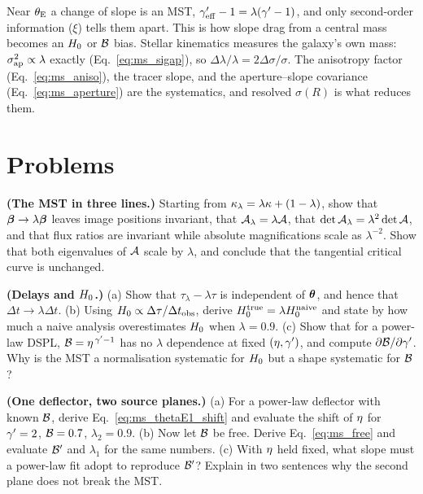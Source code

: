 Near $\theta_{\mathrm{E}}$ a change of slope is an MST, $\gamma'_{\rm eff}-1=\lambda(\gamma'-1)$,
and only second-order information ($\xi$) tells them apart.  This is how
slope drag from a central mass becomes an $H_0$ or $\mathcal{B}$ bias.
Stellar kinematics measures the galaxy's own mass:
$\sigma_{\rm ap}^2\propto\lambda$ exactly (Eq.~\ref{eq:ms_sigap}), so
$\Delta\lambda/\lambda=2\Delta\sigma/\sigma$.  The anisotropy factor
(Eq.~\ref{eq:ms_aniso}), the tracer slope, and the aperture--slope covariance
(Eq.~\ref{eq:ms_aperture}) are the systematics, and resolved $\sigma(R)$ is
what reduces them.


\section{Problems}
\label{sec:ms_problems}

\begin{exercise}
\label{ex:ms_three_lines}
\textbf{(The MST in three lines.)}  Starting from
$\kappa_\lambda=\lambda\kappa+(1-\lambda)$, show that
$\boldsymbol{\beta}\to\lambda\boldsymbol{\beta}$ leaves image positions invariant, that
$\mathcal{A}_\lambda=\lambda\mathcal{A}$, that $\det\mathcal{A}_\lambda=\lambda^2\det\mathcal{A}$, and
that flux ratios are invariant while absolute magnifications scale as
$\lambda^{-2}$.  Show that both eigenvalues of $\mathcal{A}$ scale by $\lambda$, and
conclude that the tangential critical curve is unchanged.
\end{exercise}

\begin{exercise}
\label{ex:ms_delays}
\textbf{(Delays and $H_0$.)}  (a) Show that
$\tau_\lambda-\lambda\tau$ is independent of $\boldsymbol{\theta}$, and hence that
$\Delta t\to\lambda\Delta t$.  (b) Using $H_0\propto\Delta\tau/\Delta t_{\rm obs}$,
derive $H_0^{\rm true}=\lambda H_0^{\rm naive}$ and state by how much a
naive analysis overestimates $H_0$ when $\lambda=0.9$.  (c) Show that for
a power-law DSPL, $\mathcal{B}=\eta^{\,\gamma'-1}$ has no $\lambda$ dependence at fixed
$(\eta,\gamma')$, and compute $\partial\mathcal{B}/\partial\gamma'$.  Why is the MST a
normalisation systematic for $H_0$ but a shape systematic for $\mathcal{B}$?
\end{exercise}

\begin{exercise}
\label{ex:ms_two_planes}
\textbf{(One deflector, two source planes.)}  (a) For a power-law deflector
with known $\mathcal{B}$, derive Eq.~\eqref{eq:ms_thetaE1_shift} and evaluate the
shift of $\eta$ for $\gamma'=2$, $\mathcal{B}=0.7$, $\lambda_2=0.9$.  (b) Now let
$\mathcal{B}$ be free.  Derive Eq.~\eqref{eq:ms_free} and evaluate $\mathcal{B}'$ and
$\lambda_1$ for the same numbers.  (c) With $\eta$ held fixed, what slope
must a power-law fit adopt to reproduce $\mathcal{B}'$?  Explain in two sentences
why the second plane does not break the MST.
\end{exercise}

